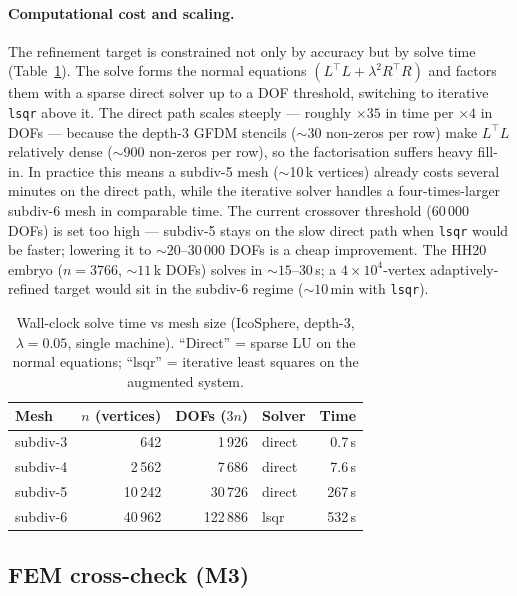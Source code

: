 \documentclass[11pt]{article}
\begin{document}
\paragraph{Computational cost and scaling.}
The refinement target is constrained not only by accuracy but by solve
time (Table~\ref{tab:timing}).  The solve forms the normal equations
$(L^\top L+\lambda^2 R^\top R)$ and factors them with a sparse direct
solver up to a DOF threshold, switching to iterative \texttt{lsqr} above
it.  The direct path scales steeply — roughly $\times35$ in time per
$\times4$ in DOFs — because the depth-3 GFDM stencils ($\sim$30 non-zeros
per row) make $L^\top L$ relatively dense ($\sim$900 non-zeros per row),
so the factorisation suffers heavy fill-in.  In practice this means a
subdiv-5 mesh ($\sim$10\,k vertices) already costs several minutes on the
direct path, while the iterative solver handles a four-times-larger
subdiv-6 mesh in comparable time.  The current crossover threshold
($60\,000$ DOFs) is set too high — subdiv-5 stays on the slow direct path
when \texttt{lsqr} would be faster; lowering it to ${\sim}20$--$30\,000$
DOFs is a cheap improvement.  The HH20 embryo ($n=3766$, ${\sim}11\,$k
DOFs) solves in ${\sim}15$--$30$\,s; a $4\times10^{4}$-vertex
adaptively-refined target would sit in the subdiv-6 regime
(${\sim}10$\,min with \texttt{lsqr}).

\begin{table}[ht]\centering
\caption{Wall-clock solve time vs mesh size (IcoSphere, depth-3,
$\lambda=0.05$, single machine).  ``Direct'' = sparse LU on the normal
equations; ``lsqr'' = iterative least squares on the augmented system.}
\label{tab:timing}
\begin{tabular}{lrrlr}
\toprule
Mesh & $n$ (vertices) & DOFs ($3n$) & Solver & Time \\
\midrule
subdiv-3 &    642 &   1\,926 & direct & 0.7\,s \\
subdiv-4 &  2\,562 &   7\,686 & direct & 7.6\,s \\
subdiv-5 & 10\,242 &  30\,726 & direct & 267\,s \\
subdiv-6 & 40\,962 & 122\,886 & lsqr   & 532\,s \\
\bottomrule
\end{tabular}
\end{table}

\subsection{FEM cross-check (M3)}
\end{document}

